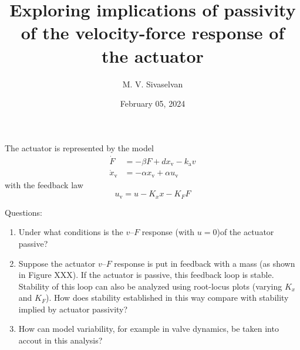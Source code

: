 \documentclass{article}
\title{Exploring implications of passivity of the velocity-force response of the actuator}
\author{M. V. Sivaselvan}
\date{February 05, 2024}
\newcommand{\xv}{x_\text{v}}
\newcommand{\xvdot}{\dot{x}_\text{v}}
\newcommand{\uv}{u_\text{v}}
\newcommand{\ka}{k_\text{a}}
\newcommand{\Kx}{K_x}
\newcommand{\KF}{K_F}
\begin{document}
\maketitle

The actuator is represented by the model
\begin{equation}
	\begin{aligned}
		\dot{F} &= -\beta F + d\xv - \ka v \\
		\xvdot  &= -\alpha \xv + \alpha \uv
	\end{aligned}
	\label{eq:ActuatorModel}
\end{equation}
with the feedback law
\begin{equation}
	\uv = u - \Kx x - \KF F
	\label{eq:ActuatorFeedback}
\end{equation}

Questions:
\begin{enumerate}
	\item Under what conditions is the $v$--$F$ response (with $u = 0$)of the actuator passive?
	\item Suppose the actuator $v$--$F$ response is put in feedback with a mass (as shown in Figure XXX).
		If the actuator is passive, this feedback loop is stable.
		Stability of this loop can also be analyzed using root-locus plots (varying $\Kx$ and $\KF$).
		How does stability established in this way compare with stability implied by actuator passivity?
	\item How can model variability, for example in valve dynamics, be taken into accout in this analysis?
\end{enumerate}
\end{document}
